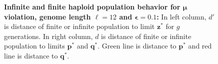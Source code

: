 \begin{figure}[h]
\begin{center}
\hspace{-3em}%
\vspace{-0.5em} \hspace{-3em}%


\caption[\textbf{Infinite and finite haploid population behavior for $\bm{\mu}$ violation, genome length $\ell = 12$ and $\bm{\epsilon} = 0.1$}]{\textbf{Infinite and finite haploid population behavior for $\bm{\mu}$ violation, genome length $\ell = 12$ and $\bm{\epsilon} = 0.1$:} 
  In left column, $d'$ is distance of finite or infinite population to limit $\bm{z}^\ast$ for $g$ generations. In right column, $d$ is distance of finite or infinite population to limits $\bm{p}^\ast$ and $\bm{q}^\ast$. Green line is distance to $\bm{p}^\ast$ and red line is distance to $\bm{q}^\ast$.}
\label{oscillation_12h_vio_mu_0.1}
\end{center}
\end{figure}

